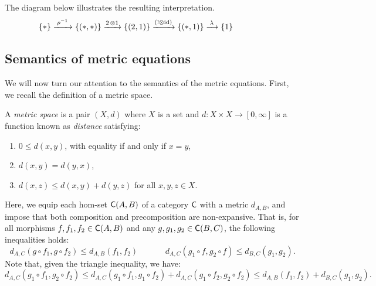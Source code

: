 \begin{example}
   The diagram below illustrates the resulting interpretation.
   \begin{align*}
   & \hspace{-40pt} & \{*\} & \xrightarrow{\hspace{2pt}\rho^{-1}\hspace{2pt}}    \{(*,*)\}  \xrightarrow{2  \, \otimes 1}   \{(2,1)\}     \xrightarrow{(! \otimes \id)} \{(*,1)\} \xrightarrow{\hspace{2pt}\lambda \hspace{2pt}} \{1\}
   \end{align*}
\end{example}


\subsection{Semantics of metric equations} \label{subsec:semantics_metric}
 We will now turn our attention to the semantics of the metric equations. First, we recall the definition of a metric space.

 \begin{definition} \label{def:metric_space}
    A \emph{metric space} is a pair $(X, d)$ where $X$ is a set and $d: X \times X \to [0, \infty]$ is a function known as \emph{distance} satisfying:
    \begin{enumerate}
        \item $0 \leq d(x, y)$, with equality if and only if $x = y$,
        \item $d(x, y) = d(y, x)$,
        \item $d(x, z) \leq d(x, y) + d(y, z)$ for all $x, y, z \in X$.
    \end{enumerate}
  \end{definition}
 
 Here, we equip each hom-set $\mathsf{C}(A, B)$ of a category $\mathsf{C}$ with a metric $d_{A,B}$, and impose that both composition and precomposition are non-expansive. That is, for all morphisms $f,f_1, f_2 \in \mathsf{C}(A, B)$ and any $g, g_1, g_2 \in \mathsf{C}(B, C)$, the following inequalities holds:
$$
d_{A,C}(g \circ f_1, g \circ f_2) \leq d_{A,B}(f_1, f_2) \hspace{40pt} d_{A,C}(g_1 \circ f, g_2 \circ f) \leq d_{B,C}(g_1, g_2).
$$
Note that, given the triangle inequality, we have:
\begin{equation*}
  d_{A,C}(g_1 \circ f_1, g_2 \circ f_2) \leq  d_{A,C}(g_1 \circ f_1, g_1 \circ f_2) + d_{A,C}(g_1 \circ f_2, g_2 \circ f_2) \leq  d_{A,B}(f_1, f_2) +   d_{B,C}(g_1, g_2).
\end{equation*}

